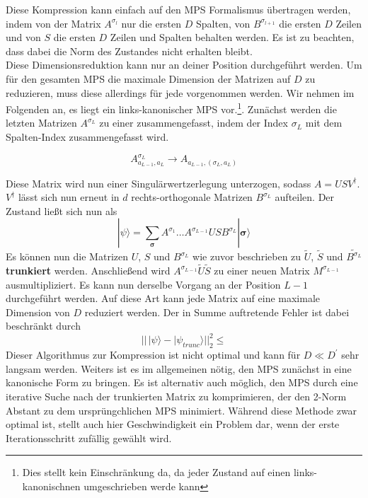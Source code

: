\documentclass[10pt,a4paper]{report}
\begin{document}
Diese Kompression kann einfach auf den MPS Formalismus übertragen werden, indem von der Matrix $A^{\sigma_l}$ nur die ersten $D$ Spalten, von $B^{\sigma_{l+1}}$ die ersten $D$ Zeilen und von $S$ die ersten $D$ Zeilen und Spalten behalten werden. Es ist zu beachten, dass dabei die Norm des Zustandes nicht erhalten bleibt.\\

Diese Dimensionsreduktion kann nur an deiner Position durchgeführt werden. Um für den gesamten MPS die maximale Dimension der Matrizen auf $D$ zu reduzieren, muss diese allerdings für jede vorgenommen werden. Wir nehmen im Folgenden an, es liegt ein links-kanonischer MPS vor.\footnote{Dies stellt kein Einschränkung da, da jeder Zustand auf einen links-kanonischnen umgeschrieben werde kann}. Zunächst werden die letzten Matrizen $A^{\sigma_L}$ zu einer zusammengefasst, indem der Index $\sigma_L$ mit dem Spalten-Index zusammengefasst wird.

\begin{equation}
A_{a_{L-1},a_L}^{\sigma_L}\rightarrow A_{a_{L-1},(\sigma_L,a_L)}
\end{equation}

Diese Matrix wird nun einer Singulärwertzerlegung unterzogen, sodass $A=USV^\dagger$. $V^\dagger$ lässt sich nun erneut in $d$ rechts-orthogonale Matrizen $B^{\sigma_L}$ aufteilen. Der Zustand ließt sich nun als
\begin{equation}
|\psi\rangle=\sum_{\bm{\sigma}}A^{\sigma_1}\ldots A^{\sigma_{L-1}}USB^{\sigma_L}|\bm{\sigma}\rangle
\end{equation}
Es können nun die Matrizen $U$, $S$ und $B^{\sigma_L}$ wie zuvor beschrieben zu $\tilde{U}$, $\tilde{S}$ und $\tilde{B^{\sigma_L}}$ \textbf{trunkiert} werden. Anschließend wird $A^{\sigma_{L-1}}\tilde{U}\tilde{S}$ zu einer neuen Matrix $M^{\sigma_{L-1}}$ ausmultipliziert. Es kann nun derselbe Vorgang an der Position $L-1$ durchgeführt werden. Auf diese Art kann jede  Matrix auf eine maximale Dimension von $D$ reduziert werden. Der in Summe auftretende Fehler ist dabei beschränkt durch
\begin{equation}
||\,|\psi\rangle-|\psi_{trunc}\rangle||_2^2\leq
\end{equation}
Dieser Algorithmus zur Kompression ist nicht optimal und kann für $D\ll D^\prime$ sehr langsam werden. Weiters ist es im allgemeinen nötig, den MPS zunächst in eine kanonische Form zu bringen. Es ist alternativ auch möglich, den MPS durch eine iterative Suche nach der trunkierten Matrix zu komprimieren, der den 2-Norm Abstant zu dem ursprüngchlichen MPS minimiert. Während diese Methode zwar optimal ist, stellt auch hier Geschwindigkeit ein Problem dar, wenn der erste Iterationsschritt zufällig gewählt wird.
\end{document}
